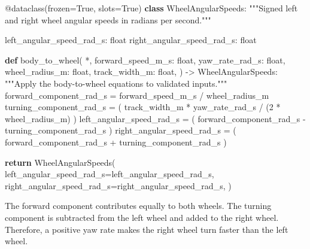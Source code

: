 \documentclass[
  australian,
  12pt,
  letterpaper,
  DIV=11,
  numbers=noendperiod,
  twoside]{scrreprt}
\newenvironment{Shaded}{\begin{snugshade}}{\end{snugshade}}
\newcommand{\AttributeTok}[1]{\textcolor[rgb]{0.40,0.45,0.13}{#1}}
\newcommand{\BuiltInTok}[1]{\textcolor[rgb]{0.00,0.23,0.31}{#1}}
\newcommand{\CommentTok}[1]{\textcolor[rgb]{0.37,0.37,0.37}{#1}}
\newcommand{\ControlFlowTok}[1]{\textcolor[rgb]{0.00,0.23,0.31}{\textbf{#1}}}
\newcommand{\DecValTok}[1]{\textcolor[rgb]{0.68,0.00,0.00}{#1}}
\newcommand{\KeywordTok}[1]{\textcolor[rgb]{0.00,0.23,0.31}{\textbf{#1}}}
\newcommand{\NormalTok}[1]{\textcolor[rgb]{0.00,0.23,0.31}{#1}}
\newcommand{\OperatorTok}[1]{\textcolor[rgb]{0.37,0.37,0.37}{#1}}
\newcommand{\VariableTok}[1]{\textcolor[rgb]{0.07,0.07,0.07}{#1}}
\begin{document}
\begin{Shaded}
\begin{Highlighting}[]
\AttributeTok{@dataclass}\NormalTok{(frozen}\OperatorTok{=}\VariableTok{True}\NormalTok{, slots}\OperatorTok{=}\VariableTok{True}\NormalTok{)}
\KeywordTok{class}\NormalTok{ WheelAngularSpeeds:}
    \CommentTok{"""Signed left and right wheel angular speeds in radians per second."""}

\NormalTok{    left\_angular\_speed\_rad\_s: }\BuiltInTok{float}
\NormalTok{    right\_angular\_speed\_rad\_s: }\BuiltInTok{float}


\KeywordTok{def}\NormalTok{ body\_to\_wheel(}
    \OperatorTok{*}\NormalTok{,}
\NormalTok{    forward\_speed\_m\_s: }\BuiltInTok{float}\NormalTok{,}
\NormalTok{    yaw\_rate\_rad\_s: }\BuiltInTok{float}\NormalTok{,}
\NormalTok{    wheel\_radius\_m: }\BuiltInTok{float}\NormalTok{,}
\NormalTok{    track\_width\_m: }\BuiltInTok{float}\NormalTok{,}
\NormalTok{) }\OperatorTok{{-}\textgreater{}}\NormalTok{ WheelAngularSpeeds:}
    \CommentTok{"""Apply the body{-}to{-}wheel equations to validated inputs."""}
\NormalTok{    forward\_component\_rad\_s }\OperatorTok{=}\NormalTok{ forward\_speed\_m\_s }\OperatorTok{/}\NormalTok{ wheel\_radius\_m}
\NormalTok{    turning\_component\_rad\_s }\OperatorTok{=}\NormalTok{ (}
\NormalTok{        track\_width\_m }\OperatorTok{*}\NormalTok{ yaw\_rate\_rad\_s }\OperatorTok{/}\NormalTok{ (}\DecValTok{2} \OperatorTok{*}\NormalTok{ wheel\_radius\_m)}
\NormalTok{    )}
\NormalTok{    left\_angular\_speed\_rad\_s }\OperatorTok{=}\NormalTok{ (}
\NormalTok{        forward\_component\_rad\_s }\OperatorTok{{-}}\NormalTok{ turning\_component\_rad\_s}
\NormalTok{    )}
\NormalTok{    right\_angular\_speed\_rad\_s }\OperatorTok{=}\NormalTok{ (}
\NormalTok{        forward\_component\_rad\_s }\OperatorTok{+}\NormalTok{ turning\_component\_rad\_s}
\NormalTok{    )}

    \ControlFlowTok{return}\NormalTok{ WheelAngularSpeeds(}
\NormalTok{        left\_angular\_speed\_rad\_s}\OperatorTok{=}\NormalTok{left\_angular\_speed\_rad\_s,}
\NormalTok{        right\_angular\_speed\_rad\_s}\OperatorTok{=}\NormalTok{right\_angular\_speed\_rad\_s,}
\NormalTok{    )}
\end{Highlighting}
\end{Shaded}

The forward component contributes equally to both wheels. The turning
component is subtracted from the left wheel and added to the right
wheel. Therefore, a positive yaw rate makes the right wheel turn faster
than the left wheel.
\end{document}
